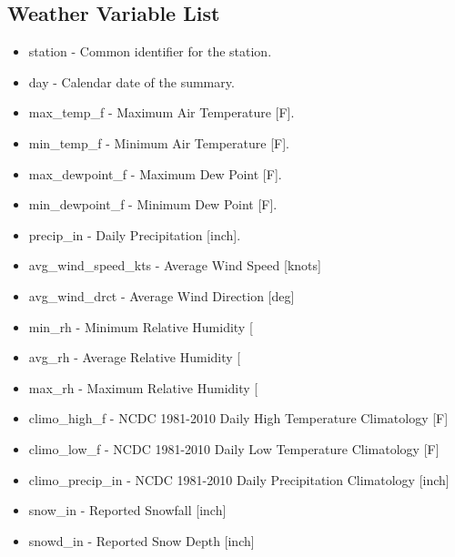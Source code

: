 \documentclass[twoside,11pt]{article}
\begin{document}
\subsection*{Weather Variable List} \label{weavarlist}
\begin{itemize}
	\item station - Common identifier for the station.
	\item day - Calendar date of the summary.
	\item max\_temp\_f - Maximum Air Temperature [F].
	\item min\_temp\_f - Minimum Air Temperature [F].
	\item max\_dewpoint\_f - Maximum Dew Point [F].
	\item min\_dewpoint\_f - Minimum Dew Point [F].
	\item precip\_in - Daily Precipitation [inch].
	\item avg\_wind\_speed\_kts - Average Wind Speed [knots]
	\item avg\_wind\_drct - Average Wind Direction [deg]
	\item min\_rh - Minimum Relative Humidity [%
	\item avg\_rh - Average Relative Humidity [%
	\item max\_rh - Maximum Relative Humidity [%
	\item climo\_high\_f - NCDC 1981-2010 Daily High Temperature Climatology [F]
	\item climo\_low\_f - NCDC 1981-2010 Daily Low Temperature Climatology [F]
	\item climo\_precip\_in - NCDC 1981-2010 Daily Precipitation Climatology [inch]
	\item snow\_in - Reported Snowfall [inch]
	\item snowd\_in - Reported Snow Depth [inch]
\end{itemize}
\end{document}
